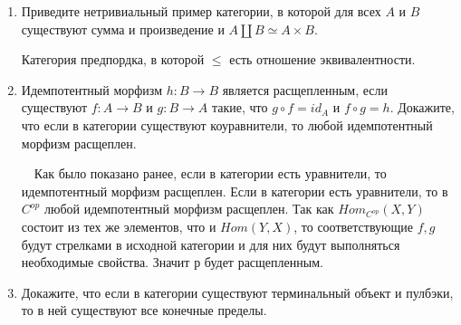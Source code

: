 \documentclass[draft]{article}
\begin{document}
\begin{enumerate}
\item Приведите нетривиальный пример категории, в которой для всех $A$ и $B$ существуют сумма и произведение и $A \amalg B \simeq A \times B$.

Категория предпордка, в которой $\leq$ есть отношение эквивалентности.

\item Идемпотентный морфизм $h : B \to B$ является расщепленным, если существуют $f : A \to B$ и $g : B \to A$ такие, что $g \circ f = id_A$ и $f \circ g = h$.
Докажите, что если в категории существуют коуравнители, то любой идемпотентный морфизм расщеплен.

~~Как было показано ранее, если в категории есть уравнители, то идемпотентный морфизм расщеплен. Если в категории есть уравнители, то в 
$C^{op}$ любой идемпотентный морфизм расщеплен. Так как $Hom_{C^{op}}(X, Y)$ состоит из тех же элементов, что и $Hom(Y, X)$, то соответствующие $f, g$ будут стрелками в исходной категории и для них будут выполняться необходимые свойства. Значит $р$ будет расщепленным.

\item Докажите, что если в категории существуют терминальный объект и пулбэки, то в ней существуют все конечные пределы.


\end{enumerate}
\end{document}
